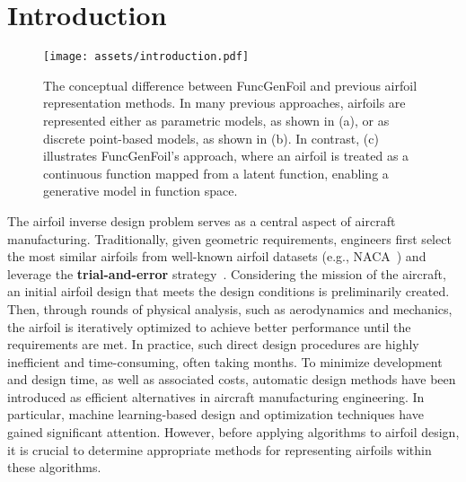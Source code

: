 \section{Introduction}

\begin{figure}[htb]
    \small
    \centering
      \texttt{[image: assets/introduction.pdf]}
      \caption{
      The conceptual difference between FuncGenFoil and previous airfoil representation methods. In many previous approaches, airfoils are represented either as parametric models, as shown in (a), or as discrete point-based models, as shown in (b). In contrast, (c) illustrates FuncGenFoil's approach, where an airfoil is treated as a continuous function mapped from a latent function, enabling a generative model in function space.}
      \label{fig:intro}
\end{figure}

The airfoil inverse design problem serves as a central aspect of aircraft manufacturing. Traditionally, given geometric requirements, engineers first select the most similar airfoils from well-known airfoil datasets (e.g., NACA~\cite{Cummings2015AppliedCA}) and leverage the \textbf{trial-and-error} strategy~\cite{sharma2021recent}. Considering the mission of the aircraft, an initial airfoil design that meets the design conditions is preliminarily created. Then, through rounds of physical analysis, such as aerodynamics and mechanics, the airfoil is iteratively optimized to achieve better performance until the requirements are met. In practice, such direct design procedures are highly inefficient and time-consuming, often taking months.
To minimize development and design time, as well as associated costs, automatic design methods have been introduced as efficient alternatives in aircraft manufacturing engineering. In particular, machine learning-based design and optimization techniques have gained significant attention. However, before applying algorithms to airfoil design, it is crucial to determine appropriate methods for representing airfoils within these algorithms.

